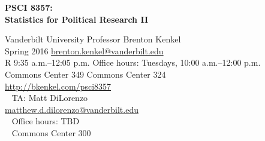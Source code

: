\documentclass[12pt,svgnames]{article}
\begin{document}
\begin{Huge}
  \textsf{\textbf{PSCI 8357:\\[0.2em] Statistics for Political Research II}}
\end{Huge}

\textsf{%
  Vanderbilt University \hfill Professor Brenton Kenkel \\
  Spring 2016 \hfill \href{mailto:brenton.kenkel@vanderbilt.edu}{brenton.kenkel@vanderbilt.edu} \\
  R 9:35 a.m.--12:05 p.m. \hfill Office hours: Tuesdays, 10:00 a.m.--12:00 p.m. \\
  Commons Center 349 \hfill Commons Center 324 \\
  \url{http://bkenkel.com/psci8357} \\
  \mbox{}~ \hfill TA: Matt DiLorenzo \\
  \mbox{} \hfill \href{mailto:matthew.d.dilorenzo@vanderbilt.edu}{matthew.d.dilorenzo@vanderbilt.edu} \\
  \mbox{}~ \hfill Office hours: TBD \\
  \mbox{}~ \hfill Commons Center 300
}

\bigskip


\end{document}
